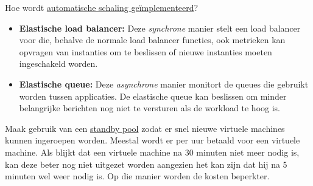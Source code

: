 	Hoe wordt \uline{automatische schaling geïmplementeerd}?
	\begin{itemize}
		\item \textbf{Elastische load balancer:} Deze \emph{synchrone} manier stelt een load balancer voor die, behalve de normale load balancer functies, ook metrieken kan opvragen van instanties om te beslissen of nieuwe instanties moeten ingeschakeld worden.
		\item \textbf{Elastische queue:} Deze \emph{asynchrone} manier monitort de queues die gebruikt worden tussen applicaties. De elastische queue kan beslissen om minder belangrijke berichten nog niet te versturen als de workload te hoog is.  
	\end{itemize}
	
	Maak gebruik van een \uline{standby pool} zodat er snel nieuwe virtuele machines kunnen ingeroepen worden. Meestal wordt er per uur betaald voor een virtuele machine. Als blijkt dat een virtuele machine na 30 minuten niet meer nodig is, kan deze beter nog niet uitgezet worden aangezien het kan zijn dat hij na 5 minuten wel weer nodig is. Op die manier worden de kosten beperkter.
